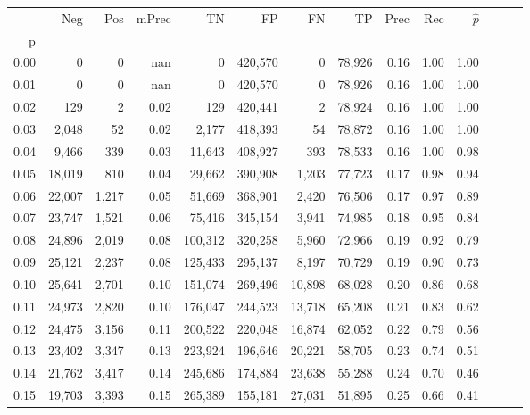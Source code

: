 \begin{tabular}{rrrrrrrrrrrrrr}
\toprule
{} &     Neg &    Pos & mPrec &       TN &       FP &      FN &      TP &  Prec &   Rec & $\hat{p}$ \\
p    &         &        &       &          &          &         &         &       &       &           \\
\midrule
0.00 &       0 &      0 &   nan &        0 &  420,570 &       0 &  78,926 &  0.16 &  1.00 &      1.00 \\
0.01 &       0 &      0 &   nan &        0 &  420,570 &       0 &  78,926 &  0.16 &  1.00 &      1.00 \\
0.02 &     129 &      2 &  0.02 &      129 &  420,441 &       2 &  78,924 &  0.16 &  1.00 &      1.00 \\
0.03 &   2,048 &     52 &  0.02 &    2,177 &  418,393 &      54 &  78,872 &  0.16 &  1.00 &      1.00 \\
0.04 &   9,466 &    339 &  0.03 &   11,643 &  408,927 &     393 &  78,533 &  0.16 &  1.00 &      0.98 \\
0.05 &  18,019 &    810 &  0.04 &   29,662 &  390,908 &   1,203 &  77,723 &  0.17 &  0.98 &      0.94 \\
0.06 &  22,007 &  1,217 &  0.05 &   51,669 &  368,901 &   2,420 &  76,506 &  0.17 &  0.97 &      0.89 \\
0.07 &  23,747 &  1,521 &  0.06 &   75,416 &  345,154 &   3,941 &  74,985 &  0.18 &  0.95 &      0.84 \\
0.08 &  24,896 &  2,019 &  0.08 &  100,312 &  320,258 &   5,960 &  72,966 &  0.19 &  0.92 &      0.79 \\
0.09 &  25,121 &  2,237 &  0.08 &  125,433 &  295,137 &   8,197 &  70,729 &  0.19 &  0.90 &      0.73 \\
0.10 &  25,641 &  2,701 &  0.10 &  151,074 &  269,496 &  10,898 &  68,028 &  0.20 &  0.86 &      0.68 \\
0.11 &  24,973 &  2,820 &  0.10 &  176,047 &  244,523 &  13,718 &  65,208 &  0.21 &  0.83 &      0.62 \\
0.12 &  24,475 &  3,156 &  0.11 &  200,522 &  220,048 &  16,874 &  62,052 &  0.22 &  0.79 &      0.56 \\
0.13 &  23,402 &  3,347 &  0.13 &  223,924 &  196,646 &  20,221 &  58,705 &  0.23 &  0.74 &      0.51 \\
0.14 &  21,762 &  3,417 &  0.14 &  245,686 &  174,884 &  23,638 &  55,288 &  0.24 &  0.70 &      0.46 \\
0.15 &  19,703 &  3,393 &  0.15 &  265,389 &  155,181 &  27,031 &  51,895 &  0.25 &  0.66 &      0.41 \\

\end{tabular}
